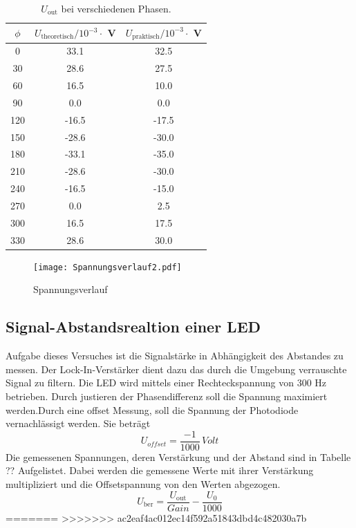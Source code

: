 \begin{table}
    \centering
    \begin{tabular}{c c c}
    	\toprule
    	$\phi$ & $U_{\text{theoretisch}} / 10^{-3} \cdot $ V & $U_{\text{praktisch}} / 10^{-3} \cdot $ V \\
    	\midrule
    	0   &  33.1  &  32.5        \\
    	30  &  28.6  &  27.5        \\
   	60  &  16.5  &  10.0       \\
    	90  &  0.0   &   0.0        \\
    	120 & -16.5  & -17.5        \\ 
    	150 & -28.6  & -30.0        \\
    	180 & -33.1  & -35.0        \\
    	210 & -28.6  & -30.0        \\
    	240 & -16.5  & -15.0        \\
    	270 &  0.0   &  2.5         \\
    	300 &  16.5  &  17.5        \\
  	330 &  28.6  &  30.0        \\
    	\end{tabular}
    \caption{$U_{\text{out}}$ bei verschiedenen Phasen.}
    \label{tab:Uphase2}
\end{table}

\begin{figure}
  \centering
  \texttt{[image: Spannungsverlauf2.pdf]}
  \caption{Spannungsverlauf}
  \label{fig:Spannungsverlauf}
\end{figure}

\subsection{Signal-Abstandsrealtion einer LED}
Aufgabe dieses Versuches ist die Signalstärke in Abhängigkeit des Abstandes zu messen. Der Lock-In-Verstärker dient dazu das durch die Umgebung verrauschte Signal zu filtern. Die LED wird mittels einer Rechteckspannung von 300 Hz betrieben. Durch justieren der Phasendifferenz soll die Spannung maximiert werden.Durch eine offset Messung, soll die Spannung der Photodiode vernachlässigt werden. Sie beträgt 
\begin{equation}
  U_{offset}= \frac{-1}{1000} \, Volt
  \label{Uoffset}
\end{equation}
Die gemessenen Spannungen, deren Verstärkung und der Abstand sind in Tabelle ?? Aufgelistet. Dabei werden die gemessene Werte mit ihrer Verstärkung multipliziert und  die Offsetspannung von den Werten abgezogen.
\begin{equation}
  U_{\text{ber}} = \frac{U_{\text{out}}}{Gain} - \frac{U_{0}}{1000}
  \label{Uber}
\end{equation}
=======
>>>>>>> ac2eaf4ac012ec14f592a51843dbd4c482030a7b
